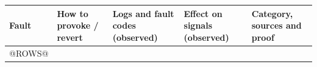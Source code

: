 \documentclass[10pt]{article}
\begin{document}
\newpage
\footnotesize
\begin{longtable}{@{}>{\raggedright\arraybackslash}p{2.7cm}>{\raggedright\arraybackslash}p{4.0cm}>{\raggedright\arraybackslash}p{7.6cm}>{\raggedright\arraybackslash}p{5.2cm}>{\raggedright\arraybackslash}p{6.0cm}@{}}
\toprule
\textbf{Fault} & \textbf{How to provoke / revert} & \textbf{Logs and fault codes (observed)} & \textbf{Effect on signals (observed)} & \textbf{Category, sources and proof} \\
\midrule
\endhead
@ROWS@
\end{longtable}
\end{document}
